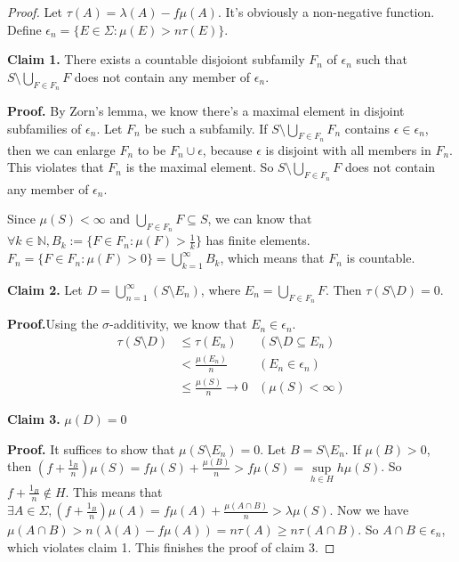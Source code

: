 \documentclass[a4paper, linespread=1.5]{article}
\begin{document}
\begin{proof}
        Let $\tau(A)=\lambda(A)-f\mu(A)$.
        It's obviously a non-negative function.
        Define $\epsilon_n=\{E\in\Sigma:\mu(E)>n\tau(E)\}$.

        \textbf{Claim 1.} There exists a countable disjoiont subfamily $F_n$ of $\epsilon_n$ such that $S\setminus \bigcup\limits_{F\in F_n}F$ does not contain any member of $\epsilon_n$.

        \textbf{Proof.} By Zorn's lemma, we know there's a maximal element in disjoint subfamilies of $\epsilon_n$.
        Let $F_n$ be such a subfamily.
        If $S\setminus\bigcup\limits_{F\in F_n}F_n$ contains $\epsilon\in\epsilon_n$, then we can enlarge $F_n$ to be $F_n \cup \epsilon$, because $\epsilon$ is disjoint with all members in $F_n$.
        This violates that $F_n$ is the maximal element.
        So $S\setminus \bigcup\limits_{F\in F_n}F$ does not contain any member of $\epsilon_n$.

        Since $\mu(S)<\infty$ and $\bigcup\limits_{F\in F_n}F \subseteq S$, we can know that $\forall k\in\mathbb{N} ,B_k:=\{F\in F_n:\mu(F)>\frac{1}{k}\}$ has finite elements.
        $F_n=\{F\in F_n:\mu(F)>0\}=\bigcup_{k=1}^{\infty}B_k$, which means that $F_n$ is countable.

        \textbf{Claim 2.} Let $D=\bigcup\limits_{n=1}^{\infty}(S\setminus E_n)$, where $E_n=\bigcup\limits_{F\in F_n}F$.
        Then  $\tau(S\setminus D)=0$.

        \textbf{Proof.}Using the $\sigma$-additivity, we know that $E_n\in\epsilon_n$.
        \begin{align*}
            \tau(S\setminus D)&\le \tau(E_n)   &(S\setminus D\subseteq E_n)\\
                              &<\frac{\mu(E_n)}{n} &(E_n\in\epsilon_n)\\
                              &\le \frac{\mu(S)}{n}\to 0&(\mu(S)<\infty)
        \end{align*}

        \textbf{Claim 3.} $\mu(D)=0$

        \textbf{Proof.} It suffices to show that $\mu(S\setminus E_n)=0$.
        Let $B=S\setminus E_n$.
        If $\mu(B)>0$, then $(f+\frac{1_B}{n})\mu(S)=f\mu(S)+\frac{\mu(B)}{n}>f\mu(S)=\sup\limits_{h\in H} h\mu(S)$.
        So $f+\frac{1_B}{n}\notin H$.
        This means that $\exists A\in\Sigma,(f+\frac{1_B}{n})\mu(A)=f\mu(A)+\frac{\mu(A\cap B)}{n}>\lambda\mu(S) $.
        Now we have $\mu(A\cap B) > n(\lambda(A)-f\mu(A))=n\tau(A)\ge n\tau(A\cap B)$.
        So $A\cap B\in\epsilon_n$, which violates claim 1.
        This finishes the proof of claim 3.


\end{proof}
\end{document}
